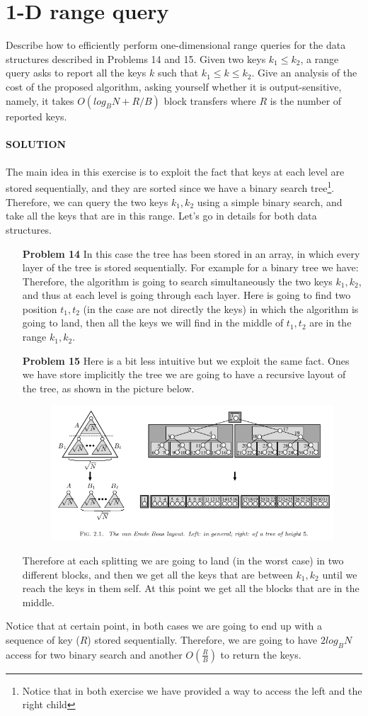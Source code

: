 \documentclass[a4paper]{article}
\begin{document}
\section*{1-D range query}
Describe how to efficiently perform one-dimensional range queries
for the data structures described in Problems 14 and 15. Given two keys $k_1 \leq k_2$, a
range query asks to report all the keys $k$ such that $k_1 \leq k \leq k_2$. Give an analysis of the
cost of the proposed algorithm, asking yourself whether it is output-sensitive, namely,
it takes $O(log_B N + R/B)$ block transfers where $R$ is the number of reported keys.
\\
\\
\textbf{SOLUTION}
\\
\\
The main idea in this exercise is to exploit the fact that keys at each level are stored sequentially, and they are sorted since we have a binary search tree\footnote{Notice that in both exercise we have provided a way to access the left and the right child}. Therefore, we can query the two keys $k_1,k_2$ using a simple binary search, and take all the keys that are in this range. Let's go in details for both data structures.
\begin{itemize}
\item[\textbf{Problem 14}] In this case the tree has been stored in an array, in which every layer of the tree is stored sequentially. For example for a binary tree we have: 
\begin{equation}
[root,L_1,R_1,L_{11},R_{11},L_{21},R_{22},...] \nonumber
\end{equation}
Therefore, the algorithm is going to search simultaneously the two keys $k_1,k_2$, and thus at each level is going through each layer. Here is going to find two position $t_1,t_2$ (in the case are not directly the keys) in which the algorithm is going to land, then all the keys we will find in the middle of $t_1,t_2$ are in the range $k_1,k_2$. 
\item[\textbf{Problem 15}] Here is a bit less intuitive but we exploit the same fact. Ones we have store implicitly the tree we are going to have a recursive layout of the tree, as shown in the picture below.
\begin{figure}[H]
\centering
\includegraphics[scale=0.35]{VDB.png}
\end{figure}
Therefore at each splitting we are going to land (in the worst case) in two different blocks, and then we get all the keys that are between $k_1,k_2$ until we reach the keys in them self. At this point we get all the blocks that are in the middle. 
\end{itemize}
Notice that at certain point, in both cases we are going to end up with a sequence of key ($R$) stored sequentially. Therefore, we are going to have $2 log_B N$ access for two binary search and another $O(\frac{R}{B})$ to return the keys.
\end{document}
